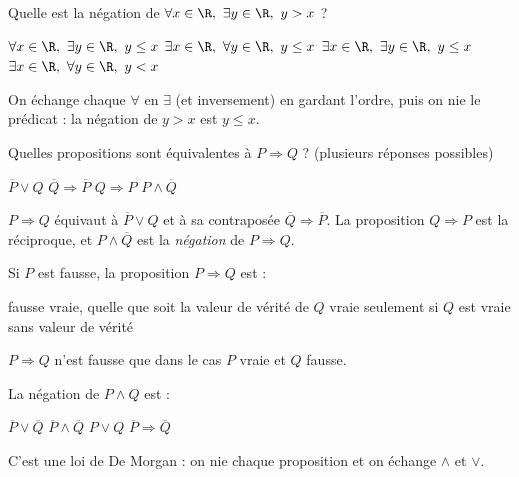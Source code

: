 
\begin{question}
Quelle est la négation de $\forall x\in\R,\ \exists y\in\R,\ y>x$ ?
\begin{reponses}
  \mauvaise $\forall x\in\R,\ \exists y\in\R,\ y\le x$
  \bonne $\exists x\in\R,\ \forall y\in\R,\ y\le x$
  \mauvaise $\exists x\in\R,\ \exists y\in\R,\ y\le x$
  \mauvaise $\exists x\in\R,\ \forall y\in\R,\ y<x$
\end{reponses}
\begin{explication}
On échange chaque $\forall$ en $\exists$ (et inversement) en gardant l'ordre, puis on nie le prédicat : la négation de $y>x$ est $y\le x$.
\end{explication}
\end{question}

\begin{question}
Quelles propositions sont équivalentes à $P\Rightarrow Q$ ? (plusieurs réponses possibles)
\begin{reponses}
  \bonne $\overline{P}\vee Q$
  \bonne $\overline{Q}\Rightarrow\overline{P}$
  \mauvaise $Q\Rightarrow P$
  \mauvaise $P\wedge\overline{Q}$
\end{reponses}
\begin{explication}
$P\Rightarrow Q$ équivaut à $\overline P\vee Q$ et à sa contraposée $\overline Q\Rightarrow\overline P$. La proposition $Q\Rightarrow P$ est la réciproque, et $P\wedge\overline Q$ est la \emph{négation} de $P\Rightarrow Q$.
\end{explication}
\end{question}

\begin{question}
Si $P$ est fausse, la proposition $P\Rightarrow Q$ est :
\begin{reponses}
  \mauvaise fausse
  \bonne vraie, quelle que soit la valeur de vérité de $Q$
  \mauvaise vraie seulement si $Q$ est vraie
  \mauvaise sans valeur de vérité
\end{reponses}
\begin{explication}
$P\Rightarrow Q$ n'est fausse que dans le cas $P$ vraie et $Q$ fausse.
\end{explication}
\end{question}

\begin{question}
La négation de $P\wedge Q$ est :
\begin{reponses}
  \bonne $\overline{P}\vee\overline{Q}$
  \mauvaise $\overline{P}\wedge\overline{Q}$
  \mauvaise $P\vee Q$
  \mauvaise $\overline{P}\Rightarrow\overline{Q}$
\end{reponses}
\begin{explication}
C'est une loi de De Morgan : on nie chaque proposition et on échange $\wedge$ et $\vee$.
\end{explication}
\end{question}

